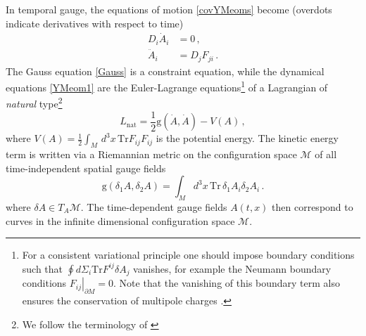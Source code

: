 \documentclass[11pt,a4paper]{article}
\def\calm{{\mathcal{M}}}
\def\de{\delta}
\def\rg{{\mathrm{g}}}
\def\nat{{\mathrm{nat}}}
\def\Tr{\mathrm{Tr}}
\begin{document}
    In temporal gauge, the equations of motion \eqref{covYMeoms} become (overdots indicate  derivatives with respect to time)
    \begin{align}
    D_i\dot A_i&=0\label{Gauss}\,,\\
    \ddot A_i&=D_jF_{ji}\,.\label{YMeom1}
    \end{align}
    The Gauss equation \eqref{Gauss} is a constraint equation, while the dynamical equations \eqref{YMeom1} are the Euler-Lagrange equations\footnote{\label{boundnote}For a consistent variational principle one should impose boundary conditions such that $\oint d\Sigma_i \Tr F^{ij}\de A_j$ vanishes, for example the Neumann boundary conditions $\left.F_{ij}\right|_{\partial M}=0$. Note that the vanishing of this boundary term also ensures the conservation of multipole charges \cite{Seraj:2016jxi}.} of a Lagrangian of \textit{natural} type\footnote{We follow the terminology of \cite{arnol2013mathematical, Stuart:2007zz} }
    \begin{equation}
    L_\nat=\frac{1}{2}\rg(\dot A,\dot A)-V(A)\,,\label{YMnat}
    \end{equation} 
    where $V(A)=\frac{1}{2}\int_M\, d^3x\, \Tr F_{ij}F_{ij}$ is the potential energy. The kinetic energy term is written via a Riemannian metric on the configuration space $\calm$ of all time-independent spatial gauge fields 
    \begin{equation}
    \rg(\delta_1 A,\delta_2 A)=\int_Md^3x\, \Tr\, \delta_1 A_i\delta_2 A_i\,. \label{natmet}
    \end{equation}
    where $\delta A\in T_A\calm$.  The time-dependent gauge fields $A(t,x)$ then correspond to curves in the infinite dimensional configuration space $\calm$. 
    
\end{document}
